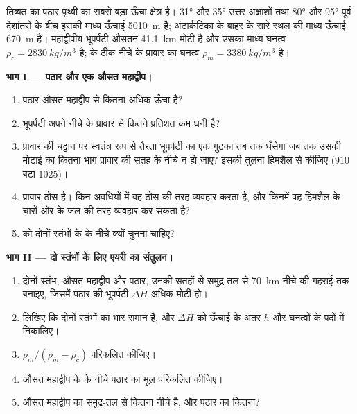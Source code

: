 \begin{problem}[{सप्ताहांत समस्या --- एक पठार को तौलना}]
\label{pb:g11:lithosphere-asthenosphere:1}
तिब्बत का पठार पृथ्वी का सबसे बड़ा ऊँचा क्षेत्र है।
\ang{31} और \ang{35} उत्तर अक्षांशों तथा \ang{80} और \ang{95} पूर्व देशांतरों के बीच इसकी
माध्य ऊँचाई \qty{5010}{m} है; अंटार्कटिका के बाहर के सारे स्थल की माध्य ऊँचाई
\qty{670}{m} है। महाद्वीपीय भूपर्पटी औसतन \qty{41.1}{km} मोटी है
और उसका माध्य घनत्व $\rho_c = \qty{2830}{kg/m^3}$ है;  के ठीक
नीचे के प्रावार का घनत्व $\rho_m = \qty{3380}{kg/m^3}$ है।

\medskip
\noindent\textbf{भाग I --- पठार और एक औसत महाद्वीप।}
\begin{enumerate}
  \item पठार औसत महाद्वीप से कितना अधिक ऊँचा है?
  \item भूपर्पटी अपने नीचे के प्रावार से कितने प्रतिशत कम घनी है?
  \item प्रावार की चट्टान पर स्वतंत्र रूप से तैरता भूपर्पटी का एक गुटका तब तक धँसेगा जब तक
        उसकी मोटाई का कितना भाग प्रावार की सतह के नीचे न हो जाए? इसकी तुलना
        हिमशैल से कीजिए ($910$ बटा $1025$)।
  \item प्रावार ठोस है। किन अवधियों में वह
        ठोस की तरह व्यवहार करता है, और किनमें वह हिमशैल के चारों ओर के जल की
        तरह व्यवहार कर सकता है?
  \item {} को दोनों स्तंभों के  के नीचे क्यों चुनना
        चाहिए?
\end{enumerate}

\medskip
\noindent\textbf{भाग II --- दो स्तंभों के लिए एयरी का संतुलन।}
\begin{enumerate}[resume]
  \item दोनों स्तंभ, औसत महाद्वीप और पठार, उनकी सतहों से
        समुद्र-तल से \qty{70}{km} नीचे की गहराई तक बनाइए, जिसमें
        पठार की भूपर्पटी $\Delta H$ अधिक मोटी हो।
  \item लिखिए कि दोनों स्तंभों का भार समान है, और $\Delta H$ को
        ऊँचाई के अंतर $h$ और घनत्वों के पदों में निकालिए।
  \item $\rho_m/(\rho_m - \rho_c)$ परिकलित कीजिए।
  \item औसत महाद्वीप के  के नीचे पठार का मूल
        परिकलित कीजिए।
  \item औसत महाद्वीप का  समुद्र-तल से कितना नीचे है, और
        पठार का कितना?
\end{enumerate}


\end{problem}
